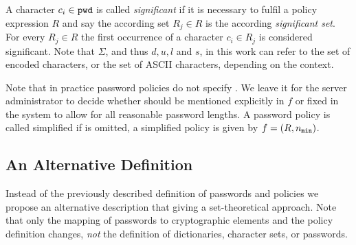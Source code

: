 \noindent
A character $c_i\in\mathtt{pwd}$ is called \emph{significant} if it is necessary to fulfil a policy expression $R$ and say the according set $R_j\in R$ is the according \emph{significant set}.
For every $R_j\in R$ the first occurrence of a character $c_i\in R_j$ is considered significant.
Note that $\Sigma$, and thus $d,u,l$ and $s$, in this work can refer to the set of encoded characters, or the set of \ac{ASCII}  characters, depending on the context.

\begin{remark}
Note that in practice password policies do not specify \pmax. 
We leave it for the server administrator to decide whether \pmax should be mentioned explicitly in $f$ or fixed in the system to allow for all reasonable password lengths.
A password policy is called simplified if \pmax is omitted, \ie a simplified policy is given by $f=(R,{n_\mathtt{min}})$.
\end{remark}


\subsection{An Alternative Definition}\label{sec:spc-passwords}
Instead of the previously described definition of passwords and policies we propose an alternative description that giving a set-theoretical approach.
Note that only the mapping of passwords to cryptographic elements and the policy definition changes, \emph{not} the definition of dictionaries, character sets, or passwords.

